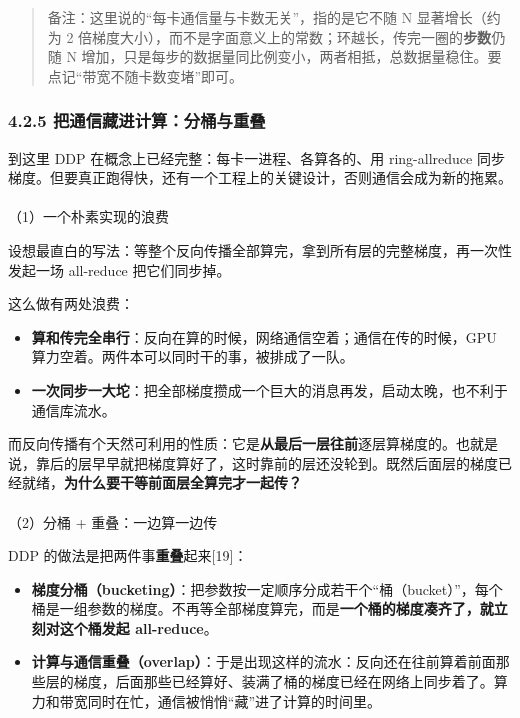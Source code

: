 \documentclass[
  chinese,
]{ctexart}
\makeatletter
\let\oldparagraph\paragraph
\renewcommand{\paragraph}{
    \@ifstar
      \xxxParagraphStar
      \xxxParagraphNoStar
  }
\newcommand{\xxxParagraphStar}[1]{\oldparagraph*{#1}\mbox{}}
\newcommand{\xxxParagraphNoStar}[1]{\oldparagraph{#1}\mbox{}}
\providecommand{\tightlist}{%
  \setlength{\itemsep}{0pt}\setlength{\parskip}{0pt}}
\makeatother
\begin{document}
\begin{quote}
备注：这里说的``每卡通信量与卡数无关''，指的是它不随 N 显著增长（约为 2
倍梯度大小），而不是字面意义上的常数；环越长，传完一圈的\textbf{步数}仍随
N
增加，只是每步的数据量同比例变小，两者相抵，总数据量稳住。要点记``带宽不随卡数变堵''即可。
\end{quote}

\subsubsection{4.2.5
把通信藏进计算：分桶与重叠}\label{ux628aux901aux4fe1ux85cfux8fdbux8ba1ux7b97ux5206ux6876ux4e0eux91cdux53e0}

到这里 DDP 在概念上已经完整：每卡一进程、各算各的、用 ring-allreduce
同步梯度。但要真正跑得快，还有一个工程上的关键设计，否则通信会成为新的拖累。

\paragraph{（1）一个朴素实现的浪费}\label{ux4e00ux4e2aux6734ux7d20ux5b9eux73b0ux7684ux6d6aux8d39}

设想最直白的写法：等整个反向传播全部算完，拿到所有层的完整梯度，再一次性发起一场
all-reduce 把它们同步掉。

这么做有两处浪费：

\begin{itemize}
\tightlist
\item
  \textbf{算和传完全串行}：反向在算的时候，网络通信空着；通信在传的时候，GPU
  算力空着。两件本可以同时干的事，被排成了一队。
\item
  \textbf{一次同步一大坨}：把全部梯度攒成一个巨大的消息再发，启动太晚，也不利于通信库流水。
\end{itemize}

而反向传播有个天然可利用的性质：它是\textbf{从最后一层往前}逐层算梯度的。也就是说，靠后的层早早就把梯度算好了，这时靠前的层还没轮到。既然后面层的梯度已经就绪，\textbf{为什么要干等前面层全算完才一起传？}

\paragraph{（2）分桶 +
重叠：一边算一边传}\label{ux5206ux6876-ux91cdux53e0ux4e00ux8fb9ux7b97ux4e00ux8fb9ux4f20}

DDP 的做法是把两件事\textbf{重叠}起来{[}19{]}：

\begin{itemize}
\tightlist
\item
  \textbf{梯度分桶（bucketing）}：把参数按一定顺序分成若干个``桶（bucket）''，每个桶是一组参数的梯度。不再等全部梯度算完，而是\textbf{一个桶的梯度凑齐了，就立刻对这个桶发起
  all-reduce}。
\item
  \textbf{计算与通信重叠（overlap）}：于是出现这样的流水：反向还在往前算着前面那些层的梯度，后面那些已经算好、装满了桶的梯度已经在网络上同步着了。算力和带宽同时在忙，通信被悄悄``藏''进了计算的时间里。
\end{itemize}
\end{document}
